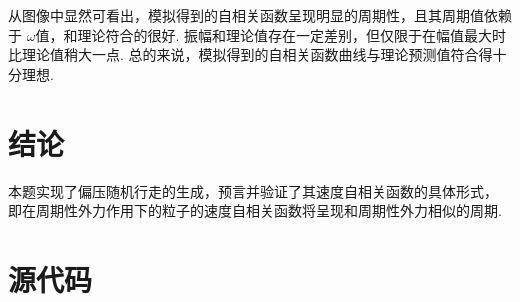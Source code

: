 \documentclass[12pt,a4paper,utf8]{ctexart}
\begin{document}
\newpage
从图像中显然可看出，模拟得到的自相关函数呈现明显的周期性，且其周期值依赖于
$\omega$值，和理论符合的很好. 振幅和理论值存在一定差别，但仅限于在幅值最大时
比理论值稍大一点. 总的来说，模拟得到的自相关函数曲线与理论预测值符合得十分理想. 

\section{结论}

本题实现了偏压随机行走的生成，预言并验证了其速度自相关函数的具体形式，
即在周期性外力作用下的粒子的速度自相关函数将呈现和周期性外力相似的周期. 

\section{源代码}
\end{document}
